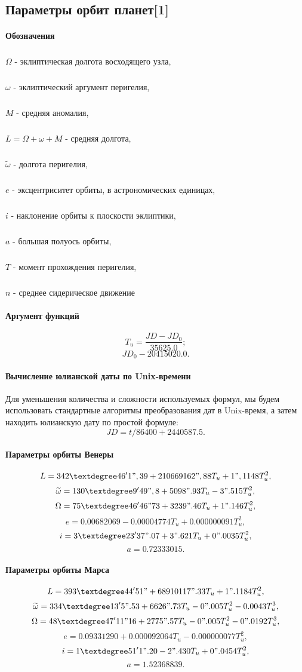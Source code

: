 \subsection{Параметры орбит планет[1]}
\paragraph{Обозначения}
\subparagraph{}$\Omega$ - эклиптическая долгота восходящего узла,
\subparagraph{}$\omega$ - эклиптический аргумент перигелия,
\subparagraph{}$M$ - средняя аномалия,
\subparagraph{}$L = \Omega + \omega + M$ - средняя долгота,
\subparagraph{}$\widetilde{\omega}$ - долгота перигелия,
\subparagraph{}$e$ - эксцентриситет орбиты, в астрономических единицах,
\subparagraph{}$i$ - наклонение орбиты к плоскости эклиптики,
\subparagraph{}$a$ - большая полуось орбиты,
\subparagraph{}$T$ - момент прохождения перигелия,
\subparagraph{}$n$ - среднее сидерическое движение

\paragraph{Аргумент функций}
$$T_u = \frac{{JD} - {JD}_0}{35625.0};$$
$${JD}_0 - 20415020.0.$$

\paragraph{Вычисление юлианской даты по Unix-времени}
Для уменьшения количества и сложности используемых формул, мы будем использовать стандартные алгоритмы преобразования дат в Unix-время, а затем находить юлианскую дату по простой формуле:
$$JD = t/86400 + 2440587.5.$$

\paragraph{Параметры орбиты Венеры}
$$L = 342°46'1",39 + 210669162",88 T_u + 1",1148 T_u^2,$$
$$\widetilde{\omega} = 130°9'49",8 + 5098".93 T_u - 3".515 T_u^2,$$
$$\Omega = 75°46'46"73 + 3239".46 T_u + 1".146 T_u^2,$$
$$e = 0.00682069 - 0.00004774 T_u + 0.000000091 T_u^2,$$
$$i = 3°23'37".07 + 3".621 T_u + 0".0035 T_u^2,$$
$$a = 0.72333015.$$

\paragraph{Параметры орбиты Марса}
$$L = 393°44'51" + 68910117".33 T_u + 1".1184 T_u^2,$$
$$\widetilde{\omega} = 334°13'5".53 + 6626".73 T_u - 0".005  T_u^2 - 0.0043  T_u^3,$$
$$\Omega = 48°47'11"16 + 2775".57 T_u - 0".005 T_u^2 - 0".0192 T_u^3,$$
$$e = 0.09331290 + 0.000092064 T_u - 0.000000077 T_u^2,$$
$$i = 1°51'1".20 - 2".430 T_u + 0".0454 T_u^2,$$
$$a = 1.52368839.$$

